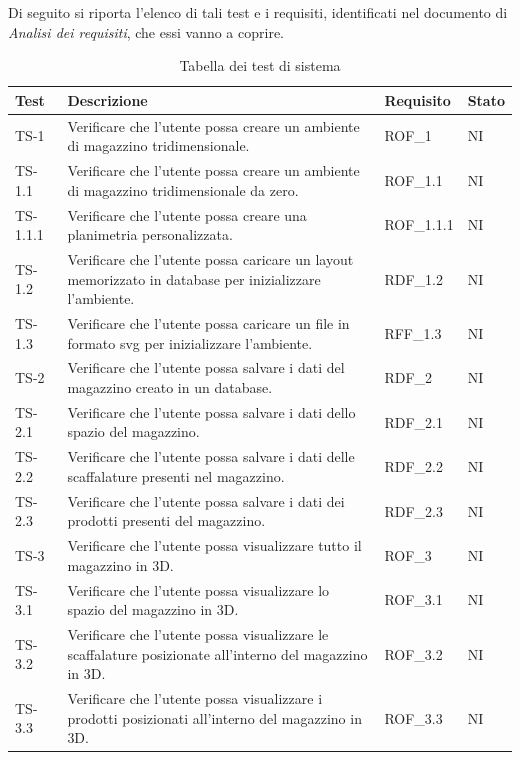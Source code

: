 Di seguito si riporta l'elenco di tali test e i requisiti, identificati nel documento di \textit{Analisi dei requisiti}, che essi vanno a coprire.
\renewcommand{\arraystretch}{1.5}
\begin{xltabular}{0.9\textwidth}{X | p{0.5\textwidth} | X | X}
    \textbf{\color{white} Test} & \textbf{\color{white} Descrizione} & \textbf{\color{white} Requisito} & \textbf{\color{white} Stato}\\ 
    \hline
    \endhead
    \caption{Tabella dei test di sistema} 
    \label{tab:test_sistema}
    \endlastfoot
    TS-1 & Verificare che l'utente possa creare un ambiente di magazzino tridimensionale. & ROF\_1 & NI\\
    TS-1.1 & Verificare che l'utente possa creare un ambiente di magazzino tridimensionale da zero. & ROF\_1.1 & NI\\
    TS-1.1.1 & Verificare che l'utente possa creare una planimetria personalizzata. & ROF\_1.1.1 & NI\\
    TS-1.2& Verificare che l'utente possa caricare un layout memorizzato in database per inizializzare l'ambiente. & RDF\_1.2  & NI\\
    TS-1.3 & Verificare che l'utente possa caricare un file in formato svg per inizializzare l'ambiente. & RFF\_1.3 & NI \\
    TS-2 & Verificare che l'utente possa salvare i dati del magazzino creato in un database. & RDF\_2& NI \\
    TS-2.1 & Verificare che l'utente possa salvare i dati dello spazio del magazzino.& RDF\_2.1 & NI   \\
    TS-2.2 & Verificare che l'utente possa salvare i dati delle scaffalature presenti nel magazzino. & RDF\_2.2& NI   \\
    TS-2.3 & Verificare che l'utente possa salvare i dati dei prodotti presenti del magazzino. & RDF\_2.3& NI     \\
    TS-3 & Verificare che l'utente possa visualizzare tutto il magazzino in 3D.& ROF\_3 & NI\\
    TS-3.1 & Verificare che l'utente possa visualizzare lo spazio del magazzino in 3D. & ROF\_3.1& NI\\
    TS-3.2 & Verificare che l'utente possa visualizzare le scaffalature posizionate all'interno del magazzino in 3D. & ROF\_3.2& NI\\
    TS-3.3 & Verificare che l'utente possa visualizzare i prodotti posizionati all'interno del magazzino in 3D. & ROF\_3.3& NI\\

\end{xltabular}
